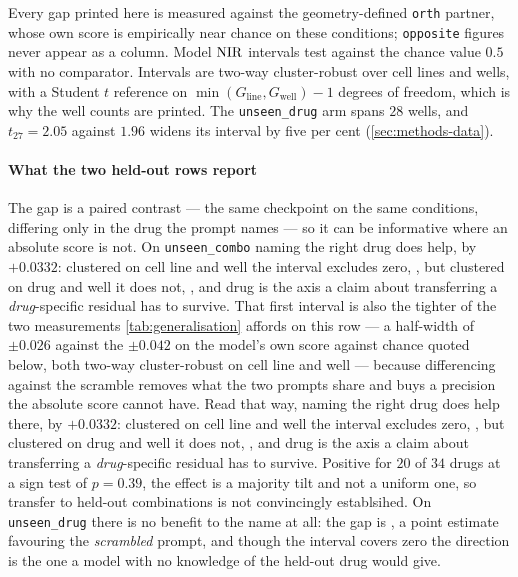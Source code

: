 \begin{table}[htbp]
\begin{fullwidth}
\begin{threeparttable}
\begin{tabularx}{\linewidth}
\bottomrule
\end{tabularx}
\begin{tablenotes}[flushleft]\footnotesize
\item Every gap printed here is measured against the geometry-defined
\texttt{orth} partner, whose own score is empirically near chance on these
conditions; \texttt{opposite} figures never appear as a column. Model $\textrm{NIR}$
intervals test against the chance value $0.5$ with no comparator. Intervals are
two-way cluster-robust over cell lines and wells, with a Student $t$ reference
on $\min(G_{\textrm{line}}, G_{\textrm{well}}) - 1$ degrees of freedom, which is
why the well counts are printed. The \texttt{unseen\_drug} arm spans $28$
wells, and $t_{27} = 2.05$ against $1.96$ widens its interval by five per cent
(\cref{sec:methods-data}).
\end{tablenotes}
\end{threeparttable}
\end{fullwidth}
\end{table}

\paragraph{What the two held-out rows report} The gap is a paired contrast --- the
same checkpoint on the same conditions, differing only in the drug the prompt
names --- so it can be informative where an absolute score is not. On
\texttt{unseen\_combo} naming the right drug does help, by $+0.0332$: clustered on
cell line and well the interval excludes zero, , but
clustered on drug and well it does not, , and drug
is the axis a claim about transferring a \emph{drug}-specific residual has to
survive. That first interval is also the tighter of the two measurements
\cref{tab:generalisation} affords on this row --- a half-width of $\pm 0.026$
against the $\pm 0.042$ on the model's own score against chance quoted below,
both two-way cluster-robust on cell line and well --- because differencing against
the scramble removes what the two prompts share and buys a precision the absolute
score cannot have. Read that way, naming the right drug does help there, by
$+0.0332$: clustered on cell line and well the interval excludes zero,
, but clustered on drug and well it does not,
, and drug is the axis a claim about transferring a
\emph{drug}-specific residual has to survive. Positive for $20$ of $34$ drugs at a
sign test of $p = 0.39$, the effect is a majority tilt and not a uniform one, so
transfer to held-out combinations is not convincingly establsihed. On \texttt{unseen\_drug}
there is no benefit to the name at all: the gap is
, a point estimate favouring the \emph{scrambled}
prompt, and though the interval covers zero the direction is the one a model with
no knowledge of the held-out drug would give.

